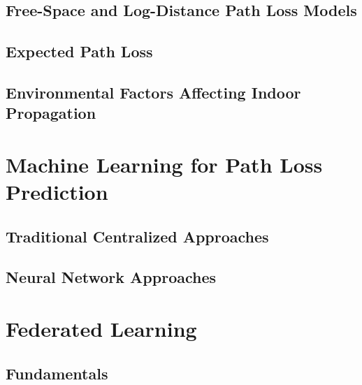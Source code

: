 \documentclass[12pt, a4paper, twoside, openright]{report}
\begin{document}
\subsection{Free-Space and Log-Distance Path Loss Models}

\subsection{Expected Path Loss}

\subsection{Environmental Factors Affecting Indoor Propagation}

\section{Machine Learning for Path Loss Prediction}
\label{sec:ml-pathloss}

\subsection{Traditional Centralized Approaches}

\subsection{Neural Network Approaches}

\section{Federated Learning}
\label{sec:fl-theory}

\subsection{Fundamentals}
\end{document}
